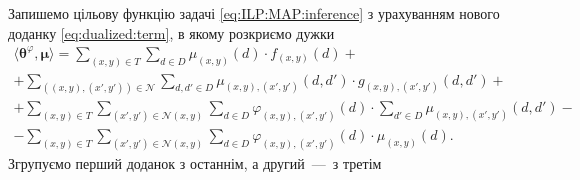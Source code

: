 Запишемо цільову функцію задачі \eqref{eq:ILP:MAP:inference}
з урахуванням нового доданку \eqref{eq:dualized:term}, в якому розкриємо дужки
\begin{equation*}
\begin{gathered}
    \langle \pmb{\theta}^{\varphi}, \pmb{\mu} \rangle =
    \sum \limits_{\left(x, y \right) \in T}
        \sum \limits_{d \in D}
            \mu_{\left(x, y \right)} \left(d \right) \cdot
            f_{\left(x, y \right)} \left( d \right) + \\
    + \sum \limits_{\left(\left(x, y \right), \left(x', y' \right) \right) \in \mathcal{N}}
        \sum \limits_{d, d' \in D}
            \mu_{\left(x, y \right), \left(x', y' \right)} \left(
                d, d'
            \right) \cdot
            g_{\left(x, y \right), \left(x', y' \right)} \left(
                d, d'
            \right) + \\
    + \sum \limits_{\left(x, y \right) \in T}
        \sum \limits_{\left(x', y' \right) \in \mathcal{N} \left(x, y \right)}
            \sum \limits_{d \in D}
                \varphi_{\left(x, y \right), \left(x', y' \right)} \left(
                    d
                \right) \cdot
                \sum \limits_{d' \in D}
                    \mu_{\left(x, y \right), \left(x', y' \right)} \left(
                        d, d'
                    \right) - \\
    - \sum \limits_{\left(x, y \right) \in T}
        \sum \limits_{\left(x', y' \right) \in \mathcal{N}\left(x, y \right)}
            \sum \limits_{d \in D}
                \varphi_{\left(x, y \right), \left(x', y' \right)} \left(
                    d
                \right) \cdot \mu_{\left(x, y \right)} \left(d \right).
\end{gathered}
\end{equation*}
Згрупуємо перший доданок з останнім, а другий~---~з третім
